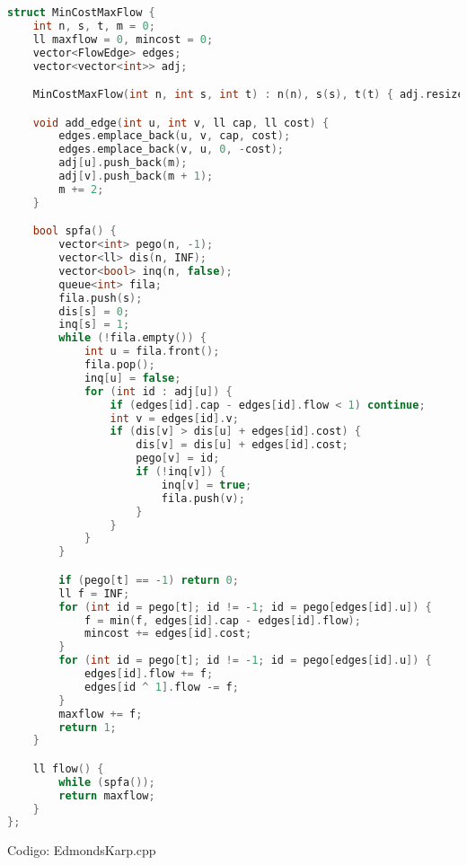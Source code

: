 \documentclass[10pt, a4paper, oneside]{book}
\begin{document}
\begin{lstlisting}[language=C++]
struct MinCostMaxFlow {
    int n, s, t, m = 0;
    ll maxflow = 0, mincost = 0;
    vector<FlowEdge> edges;
    vector<vector<int>> adj;

    MinCostMaxFlow(int n, int s, int t) : n(n), s(s), t(t) { adj.resize(n); }

    void add_edge(int u, int v, ll cap, ll cost) {
        edges.emplace_back(u, v, cap, cost);
        edges.emplace_back(v, u, 0, -cost);
        adj[u].push_back(m);
        adj[v].push_back(m + 1);
        m += 2;
    }

    bool spfa() {
        vector<int> pego(n, -1);
        vector<ll> dis(n, INF);
        vector<bool> inq(n, false);
        queue<int> fila;
        fila.push(s);
        dis[s] = 0;
        inq[s] = 1;
        while (!fila.empty()) {
            int u = fila.front();
            fila.pop();
            inq[u] = false;
            for (int id : adj[u]) {
                if (edges[id].cap - edges[id].flow < 1) continue;
                int v = edges[id].v;
                if (dis[v] > dis[u] + edges[id].cost) {
                    dis[v] = dis[u] + edges[id].cost;
                    pego[v] = id;
                    if (!inq[v]) {
                        inq[v] = true;
                        fila.push(v);
                    }
                }
            }
        }

        if (pego[t] == -1) return 0;
        ll f = INF;
        for (int id = pego[t]; id != -1; id = pego[edges[id].u]) {
            f = min(f, edges[id].cap - edges[id].flow);
            mincost += edges[id].cost;
        }
        for (int id = pego[t]; id != -1; id = pego[edges[id].u]) {
            edges[id].flow += f;
            edges[id ^ 1].flow -= f;
        }
        maxflow += f;
        return 1;
    }

    ll flow() {
        while (spfa());
        return maxflow;
    }
};
\end{lstlisting}
\hfill

Codigo: EdmondsKarp.cpp
\end{document}
